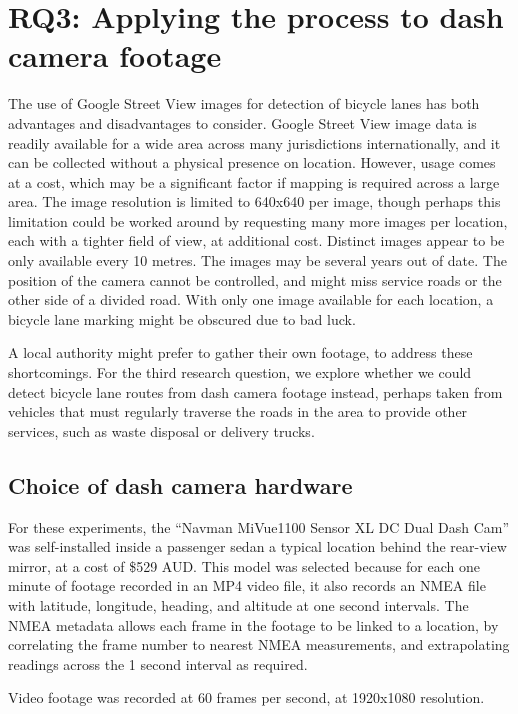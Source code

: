 \documentclass[11pt,twoside]{report}
\begin{document}
\section{RQ3: Applying the process to dash camera footage}
\label{s:rq3}

The use of Google Street View images for detection of bicycle lanes has both advantages and disadvantages to consider.  Google Street View image data is readily available for a wide area across many jurisdictions internationally, and it can be collected without a physical presence on location.  However, usage comes at a cost, which may be a significant factor if mapping is required across a large area.  The image resolution is limited to 640x640 per image, though perhaps this limitation could be worked around by requesting many more images per location, each with a tighter field of view, at additional cost.  Distinct images appear to be only available every 10 metres.  The images may be several years out of date.  The position of the camera cannot be controlled, and might miss service roads or the other side of a divided road.  With only one image available for each location, a bicycle lane marking might be obscured due to bad luck.

A local authority might prefer to gather their own footage, to address these shortcomings.  For the third research question, we explore whether we could detect bicycle lane routes from dash camera footage instead, perhaps taken from vehicles that must regularly traverse the roads in the area to provide other services, such as waste disposal or delivery trucks.


\subsection{Choice of dash camera hardware}
\label{s:rq3a}

For these experiments, the ``Navman MiVue1100 Sensor XL DC Dual Dash Cam'' was self-installed inside a passenger sedan a typical location behind the rear-view mirror, at a cost of \$529 AUD.  This model was selected because for each one minute of footage recorded in an MP4 video file, it also records an NMEA file with latitude, longitude, heading, and altitude at one second intervals.  The NMEA metadata allows each frame in the footage to be linked to a location, by correlating the frame number to nearest NMEA measurements, and extrapolating readings across the 1 second interval as required.

Video footage was recorded at 60 frames per second, at 1920x1080 resolution.
\end{document}
